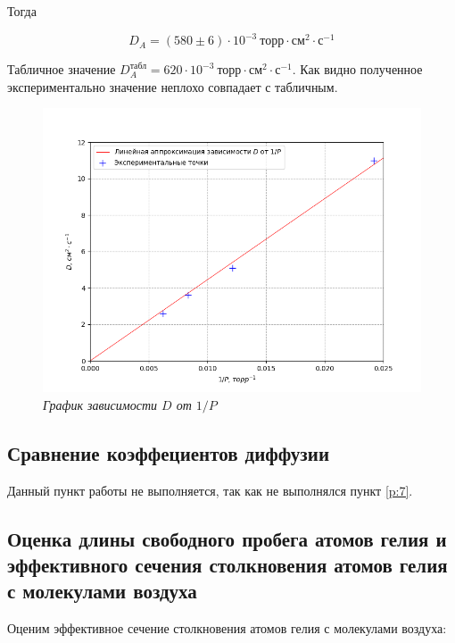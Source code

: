\documentclass[a4paper,12pt]{article}
\begin{document}
Тогда

\begin{equation}
    D_A = (580 \pm 6) \cdot 10^{-3} \ \text{торр} \cdot \text{см}^2 \cdot \text{с}^{-1}
\end{equation}

Табличное значение $D_A^\text{табл} = 620 \cdot 10^{-3} \ \text{торр} \cdot \text{см}^2 \cdot \text{с}^{-1}$. Как видно полученное экспериментально значение неплохо совпадает с табличным.

\begin{figure}[h!]
        \centering
	\includegraphics[width=1\textwidth]{graph_2.png}
	\caption{\textit{График зависимости $D$ от $1/P$}}
	\label{graph:2}
\end{figure}

\newpage

\subsection{Сравнение коэффециентов диффузии}

Данный пункт работы не выполняется, так как не выполнялся пункт \ref{p:7}.

\subsection{Оценка длины свободного пробега атомов гелия  и эффективного сечения столкновения атомов гелия с молекулами воздуха}


Оценим эффективное сечение столкновения атомов гелия с молекулами воздуха:
\end{document}
